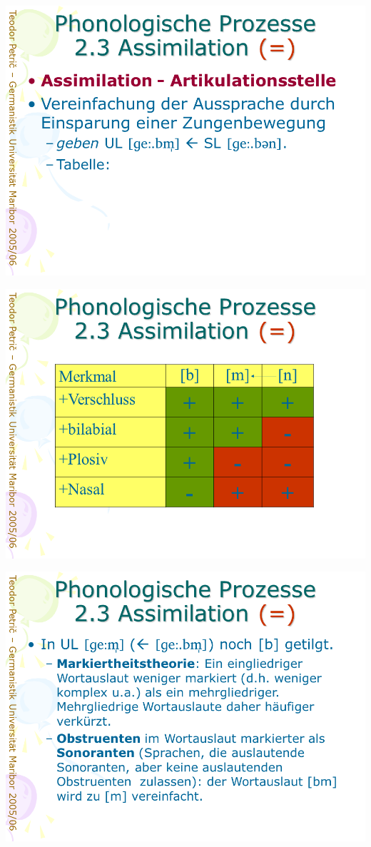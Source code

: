 \documentclass[
  letterpaper,
]{scrbook}
\begin{document}
\includegraphics[width=1\textwidth,height=\textheight]{./pictures/prozesse/prozesse_27.PNG}

\includegraphics[width=1\textwidth,height=\textheight]{./pictures/prozesse/prozesse_28.PNG}

\includegraphics[width=1\textwidth,height=\textheight]{./pictures/prozesse/prozesse_29.PNG}
\end{document}
